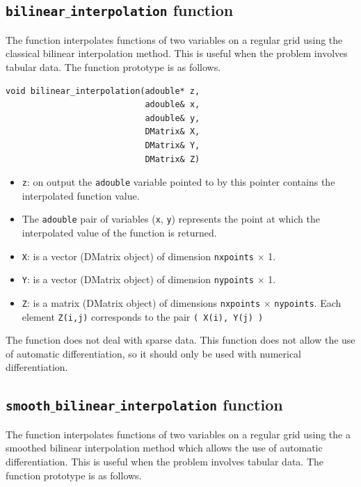 \documentclass[a4paper,11pt]{report}    %
\begin{document}
\subsection{ \texttt{bilinear$\_$interpolation} function }

The function interpolates functions of two variables on a regular grid using the classical bilinear interpolation method.
This is useful when the problem involves tabular data. The function prototype is as follows.

\begin{verbatim} 
void bilinear_interpolation(adouble* z, 
                            adouble& x, 
                            adouble& y, 
                            DMatrix& X, 
                            DMatrix& Y, 
                            DMatrix& Z)
\end{verbatim}


\begin{itemize}
\item \verb|z|:  on output the \verb|adouble| variable pointed to by this pointer contains the interpolated function value.
\item  The \verb|adouble| pair of variables (\verb|x|, \verb|y|) represents the point at which the interpolated value of the function is returned.
\item  \verb|X|: is a vector (DMatrix object) of dimension \verb|nxpoints| $\times$ 1.
\item  \verb|Y|: is a vector (DMatrix object) of dimension \verb|nypoints| $\times$ 1.
\item  \verb|Z|: is a matrix (DMatrix object) of dimensions \verb|nxpoints| $\times$ \verb|nypoints|.  Each element \verb|Z(i,j)| corresponds to the pair \verb|( X(i), Y(j) )|
\end{itemize}


The function does not deal with sparse data. This function does not allow the use of automatic differentiation, so it should
only be used with numerical differentiation.

\subsection{ \texttt{smooth$\_$bilinear$\_$interpolation} function }

The function interpolates functions of two variables on a regular grid using the a smoothed bilinear interpolation method
which allows the use of automatic differentiation. This is useful when the problem involves tabular data. The function prototype is as follows.
\end{document}

